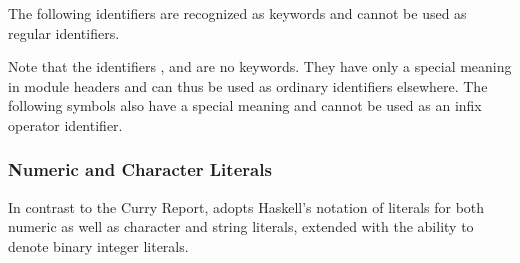 \noindent
The following identifiers are recognized as keywords
and cannot be used as regular identifiers.

\begin{grammar}
\end{grammar}

\noindent
Note that the identifiers , 
and  are no keywords.
They have only a special meaning in module headers
and can thus be used as ordinary identifiers elsewhere.
The following symbols also have a special meaning and cannot
be used as an infix operator identifier.

\begin{grammar}
\end{grammar}

\subsubsection{Numeric and Character Literals}

In contrast to the Curry Report, \CYS adopts Haskell's notation of literals
for both numeric as well as character and string literals,
extended with the ability to denote binary integer literals.

